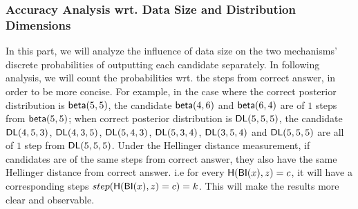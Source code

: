 \documentclass[sigconf, anonymous]{acmart}
\begin{document}
\subsubsection{Accuracy Analysis wrt. Data Size and Distribution Dimensions}
In this part, we will analyze the influence of data size on the two mechanisms' discrete probabilities of outputting each candidate separately. In following analysis, we will count the probabilities wrt. the steps from correct answer, in order to be more concise. For example, in the case where the correct posterior distribution is $\mathsf{beta}(5,5)$, the candidate $\mathsf{beta}(4,6)$ and $\mathsf{beta}(6,4)$ are of $1$ steps from $\mathsf{beta}(5,5)$; when correct posterior distribution is $\mathsf{DL}(5,5,5)$, the candidate $\mathsf{DL}(4,5,3)$, $\mathsf{DL}(4,3,5)$, $\mathsf{DL}(5,4,3)$, $\mathsf{DL}(5,3,4)$, $\mathsf{DL}(3,5,4)$ and $\mathsf{DL}(5,5,5)$ are all of $1$ step from $\mathsf{DL}(5,5,5)$. Under the Hellinger distance measurement, if candidates are of the same steps from correct answer, they also have the same Hellinger distance from correct answer. i.e for every $\mathsf{H}(\mathsf{BI}(x), z) = c$, it will have a corresponding steps $step(\mathsf{H}(\mathsf{BI}(x), z) = c) = k$. This will make the results more clear and observable.
\end{document}
